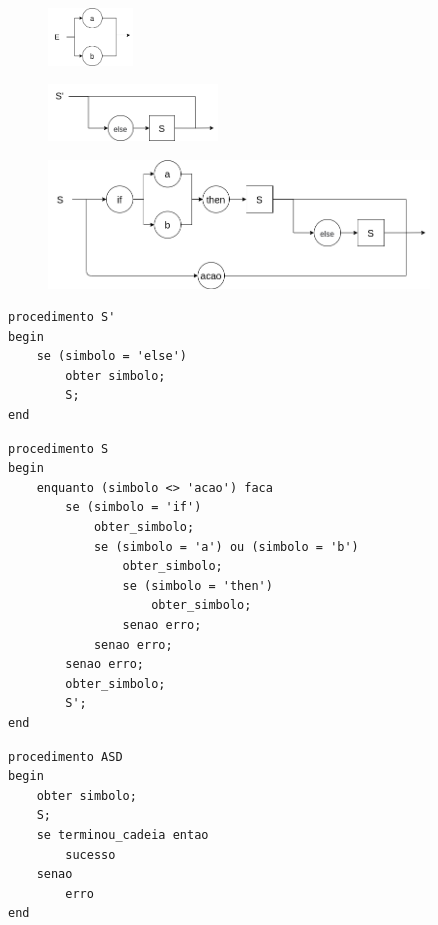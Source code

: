 \documentclass{article}
\begin{document}
\begin{figure}[ht!]
    \centering
    \includegraphics[width=0.2\textwidth]{p1/grafo_sintatico_E.png}
\end{figure}

\begin{figure}[ht!]
    \centering
    \includegraphics[width=0.4\textwidth]{p1/grafo_sintatico_S_.png}
\end{figure}

\begin{figure}[ht!]
    \centering
    \includegraphics[width=0.9\textwidth]{p1/grafo sintatico.png}
\end{figure}
\begin{lstlisting}
procedimento S'
begin
    se (simbolo = 'else')
        obter simbolo;
        S;
end
\end{lstlisting}


\begin{lstlisting}
procedimento S
begin
    enquanto (simbolo <> 'acao') faca
        se (simbolo = 'if')
            obter_simbolo;
            se (simbolo = 'a') ou (simbolo = 'b')
                obter_simbolo;
                se (simbolo = 'then')
                    obter_simbolo;
                senao erro;
            senao erro;
        senao erro;
        obter_simbolo;
        S';
end
\end{lstlisting}

\begin{lstlisting}
procedimento ASD
begin
    obter simbolo;
    S;
    se terminou_cadeia entao
        sucesso
    senao
        erro
end
\end{lstlisting}
\end{document}
